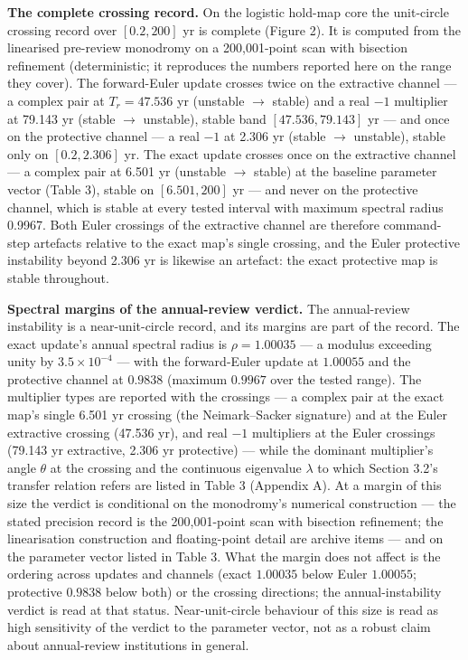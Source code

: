 \documentclass[11pt]{article}
\begin{document}
\textbf{The complete crossing record.} On the logistic
hold-map core the unit-circle crossing record over \([0.2, 200]\) yr is
complete (Figure 2). It is computed from the linearised pre-review
monodromy on a 200,001-point scan with bisection refinement (deterministic;
it reproduces the numbers reported here on the range they cover). The
forward-Euler update crosses twice on the extractive channel --- a
complex pair at \(T_r = 47.536\) yr (unstable \(\to\) stable) and a real
\(-1\) multiplier at 79.143 yr (stable \(\to\) unstable), stable band
\([47.536, 79.143]\) yr --- and once on the protective channel --- a real
\(-1\) at 2.306 yr (stable \(\to\) unstable), stable only on
\([0.2, 2.306]\) yr. The exact update crosses once on the
extractive channel --- a complex pair at 6.501 yr (unstable \(\to\) stable) at the baseline parameter vector (Table 3), stable on \([6.501, 200]\) yr --- and never on the protective
channel, which is stable at every tested interval with maximum spectral
radius 0.9967. Both Euler crossings of the extractive channel are
therefore command-step artefacts relative to the exact map's single
crossing, and the Euler protective instability beyond 2.306 yr is
likewise an artefact: the exact protective map is stable throughout.

\textbf{Spectral margins of the annual-review verdict.} The
annual-review instability is a near-unit-circle record, and its margins
are part of the record. The exact update's annual
spectral radius is \(\rho = 1.00035\) --- a modulus exceeding unity by
\(3.5\times 10^{-4}\) --- with the forward-Euler update at \(1.00055\)
and the protective channel at \(0.9838\) (maximum \(0.9967\) over the
tested range). The multiplier types are reported with the crossings ---
a complex pair at the exact map's single 6.501 yr crossing (the
Neimark--Sacker signature) and at the Euler extractive crossing (47.536 yr), and real \(-1\) multipliers at the Euler
crossings (79.143 yr extractive, 2.306 yr protective) --- while the
dominant multiplier's angle \(\theta\) at the crossing and the
continuous eigenvalue \(\lambda\) to which Section 3.2's transfer
relation refers are listed in Table 3 (Appendix A). At a margin of this size the
verdict is conditional on the monodromy's numerical construction --- the
stated precision record is the 200,001-point scan with bisection
refinement; the linearisation construction and floating-point detail are
archive items --- and on the parameter vector listed in Table 3. What
the margin does not affect is the ordering across updates and
channels (exact \(1.00035\) below Euler \(1.00055\); protective
\(0.9838\) below both) or the crossing directions; the annual-instability verdict is read at that status. Near-unit-circle behaviour of this size is read as high sensitivity of the verdict to the parameter vector, not as a robust claim about annual-review institutions in general.
\end{document}
